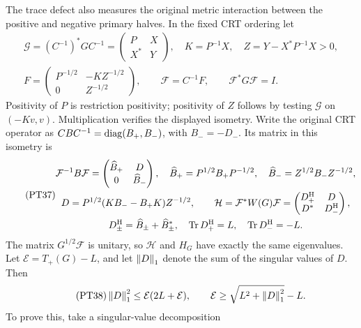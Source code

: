 The trace defect also measures the original metric interaction
between the positive and negative primary halves. In the fixed
CRT ordering let
\begin{equation}\tag{PT36}
 \begin{gathered}
 \mathcal G=(C^{-1})^*GC^{-1}
       =\begin{pmatrix}P&X\\X^*&Y\end{pmatrix},\quad
 K=P^{-1}X,\quad Z=Y-X^*P^{-1}X>0,\\
 F=\begin{pmatrix}P^{-1/2}&-KZ^{-1/2}\\0&Z^{-1/2}\end{pmatrix},
 \qquad\mathcal F=C^{-1}F,\qquad\mathcal F^*G\mathcal F=I.
 \end{gathered}
\end{equation}
Positivity of \(P\) is restriction positivity; positivity of
\(Z\) follows by testing \(\mathcal G\) on \((-Kv,v)\).
Multiplication verifies the displayed isometry. Write the original
CRT operator as \(CBC^{-1}=\operatorname{diag}(B_+,B_-)\), with
\(B_-=-D_-\). Its matrix in this isometry is
\begin{equation}\tag{PT37}
 \begin{gathered}
 \mathcal F^{-1}B\mathcal F
   =\begin{pmatrix}\widehat B_+&D\\0&\widehat B_-\end{pmatrix},
 \quad\widehat B_+=P^{1/2}B_+P^{-1/2},\quad
 \widehat B_-=Z^{1/2}B_-Z^{-1/2},\\
 D=P^{1/2}(KB_--B_+K)Z^{-1/2},\qquad
 \mathcal H=\mathcal F^*W(G)\mathcal F
   =\begin{pmatrix}D_+^{\rm H}&D\\D^*&D_-^{\rm H}\end{pmatrix},\\
 D_\pm^{\rm H}=\widehat B_\pm+\widehat B_\pm^*,\quad
 \operatorname{Tr} D_+^{\rm H}=L,\quad\operatorname{Tr} D_-^{\rm H}=-L.
 \end{gathered}
\end{equation}
The matrix \(G^{1/2}\mathcal F\) is unitary, so \(\mathcal H\)
and \(H_G\) have exactly the same eigenvalues. Let
\(\mathcal E=T_+(G)-L\), and let \(\left\lVert D\right\rVert_1\) denote the
sum of the singular values of \(D\). Then
\begin{equation}\tag{PT38}
 \left\lVert D\right\rVert_1^2\le\mathcal E(2L+\mathcal E),\qquad
 \mathcal E\ge\sqrt{L^2+\left\lVert D\right\rVert_1^2}-L.
\end{equation}
To prove this, take a singular-value decomposition
